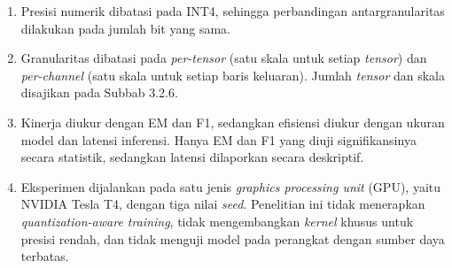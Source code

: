 \begin{enumerate}
    \item Presisi numerik dibatasi pada INT4, sehingga perbandingan antargranularitas dilakukan pada jumlah bit yang sama.
    \item Granularitas dibatasi pada \textit{per-tensor} (satu skala untuk setiap \textit{tensor}) dan \textit{per-channel} (satu skala untuk setiap baris keluaran). Jumlah \textit{tensor} dan skala disajikan pada Subbab 3.2.6.
    \item Kinerja diukur dengan EM dan F1, sedangkan efisiensi diukur dengan ukuran model dan latensi inferensi. Hanya EM dan F1 yang diuji signifikansinya secara statistik, sedangkan latensi dilaporkan secara deskriptif.
    \item Eksperimen dijalankan pada satu jenis \textit{graphics processing unit} (GPU), yaitu NVIDIA Tesla T4, dengan tiga nilai \textit{seed}. Penelitian ini tidak menerapkan \textit{quantization-aware training}, tidak mengembangkan \textit{kernel} khusus untuk presisi rendah, dan tidak menguji model pada perangkat dengan sumber daya terbatas.
\end{enumerate}
